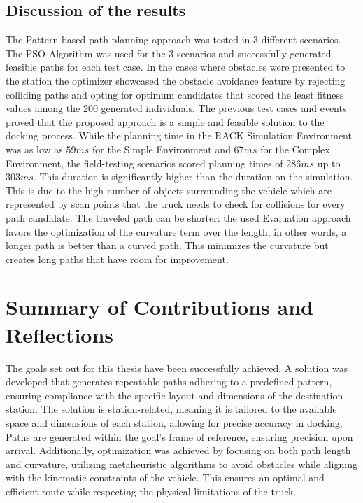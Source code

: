 \subsection{Discussion of the results}

The Pattern-based path planning approach was tested in 3 different scenarios.
The PSO Algorithm was used for the 3 scenarios and successfully generated feasible paths for each 
test case. In the cases where obstacles were presented to the station the optimizer 
showcased the obstacle avoidance feature by rejecting colliding paths and opting for optimum
candidates that scored the least fitness values among the 200 generated individuals.
The previous test cases and events proved that the proposed approach is a simple and feasible 
solution to the docking process.
While the planning time in the RACK Simulation Environment was as low as \(59ms\) for the Simple Environment
and \(67ms\) for the Complex Environment, the field-testing scenarios scored planning times of 
\(286ms\) up to \(303ms\). 
This duration is significantly higher than the duration 
on the simulation. This is due to the high number of objects surrounding the vehicle which are 
represented by scan points that the truck needs to check for collisions for every path candidate.  
The traveled path can be shorter: the used Evaluation approach favors the optimization of the 
curvature term over the length, in other words, a longer path is better than a curved path.
This minimizes the curvature but creates long paths that have room for improvement. 

\section{Summary of Contributions and Reflections}
The goals set out for this thesis have been successfully achieved. A solution was developed that generates 
repeatable paths adhering to a predefined pattern, ensuring compliance with the specific layout and dimensions 
of the destination station. The solution is station-related, meaning it is tailored to the available space and 
dimensions of each station, allowing for precise accuracy in docking. Paths are generated within the goal's 
frame of reference, ensuring precision upon arrival. Additionally, optimization was achieved by focusing on 
both path length and curvature, utilizing metaheuristic algorithms to avoid obstacles while aligning with the 
kinematic constraints of the vehicle. This ensures an optimal and efficient route while respecting the physical 
limitations of the truck.

